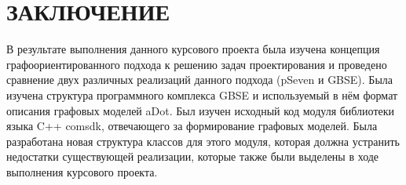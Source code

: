 \chapter*{ЗАКЛЮЧЕНИЕ}\label{chap_conclusion}
В результате выполнения данного курсового проекта была изучена концепция графоориентированного подхода к решению задач проектирования и проведено сравнение двух различных реализаций данного подхода (pSeven и GBSE). Была изучена структура программного комплекса GBSE и используемый в нём формат описания графовых моделей aDot. Был изучен исходный код модуля библиотеки языка C++ comsdk, отвечающего за формирование графовых моделей. Была разработана новая структура классов для этого модуля, которая должна устранить недостатки существующей реализации, которые также были выделены в ходе выполнения курсового проекта. 
